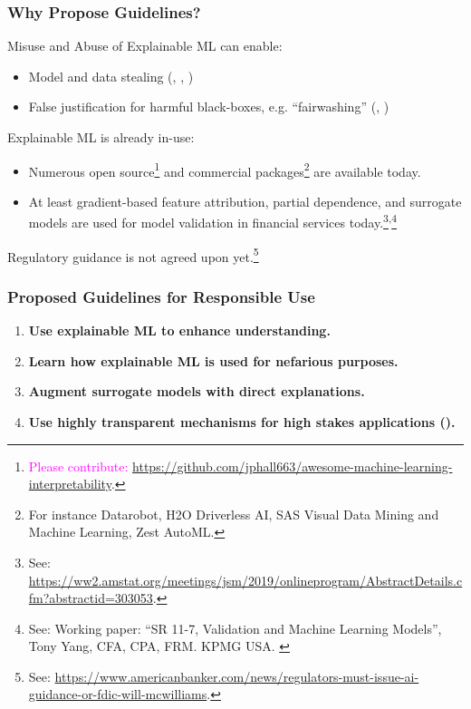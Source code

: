 \documentclass[11pt,
               aspectratio=169,
               hyperref={colorlinks}
               ]{beamer}
\begin{document}
	\begin{frame}[t]
	
		\frametitle{Why Propose Guidelines?}		

		Misuse and Abuse of Explainable ML can enable:
		\begin{itemize}\footnotesize
			\item Model and data stealing (\citet{model_stealing}, \citet{membership_inference}, \citet{shokri2019privacy})
			\item False justification for harmful black-boxes, e.g. ``fairwashing'' (\citet{fair_washing}, \citet{please_stop})
		\end{itemize}
		\vspace{5pt}		
		Explainable ML is already in-use: 
		\begin{itemize}\footnotesize
		\item Numerous open source\footnote{\tiny{\textcolor{magenta}{Please contribute:} \url{https://github.com/jphall663/awesome-machine-learning-interpretability}.}} and commercial packages\footnote{\tiny{For instance Datarobot, H2O Driverless AI, SAS Visual Data Mining and Machine Learning, Zest AutoML.}} are available today.
		\item At least gradient-based feature attribution, partial dependence, and surrogate models are used for model validation in financial services today.\footnote{\tiny{See: \url{https://ww2.amstat.org/meetings/jsm/2019/onlineprogram/AbstractDetails.cfm?abstractid=303053}.}}\textsuperscript{,}\footnote{\tiny{See: Working paper: ``SR 11-7, Validation and Machine Learning Models'', Tony Yang, CFA, CPA, FRM. KPMG USA. \label{fn:yang}}} 
		\end{itemize}
		\vspace{5pt}	
		Regulatory guidance is not agreed upon yet.\footnote{\tiny{See: \url{https://www.americanbanker.com/news/regulators-must-issue-ai-guidance-or-fdic-will-mcwilliams}.}}
		\normalsize	
		
	\end{frame}

	\begin{frame}
	
		\frametitle{Proposed Guidelines for Responsible Use}
		
		\begin{enumerate}\Large
			\item \textbf{Use explainable ML to enhance understanding.}
			\item \textbf{Learn how explainable ML is used for nefarious purposes.}
			\item \textbf{Augment surrogate models with direct explanations.}
			\item \textbf{Use highly transparent mechanisms for high stakes applications (\citet{please_stop}).}
		\end{enumerate}
		
	\end{frame}
\end{document}

